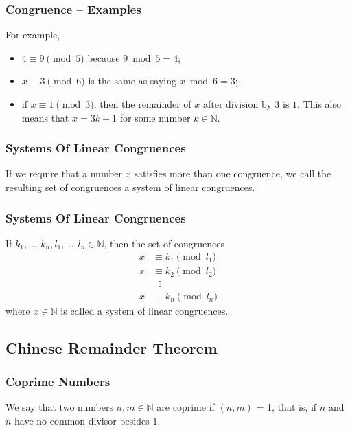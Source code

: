 \documentclass[aspectratio=169,11pt,usenames,dvipsnames]{beamer}
\newcommand{\N}{\mathbb{N}}
\begin{document}
\begin{frame}
 \frametitle{Congruence -- Examples}
 For example,
 \begin{itemize}
  \item $4 \equiv 9 \pmod{5}$ because $9 \bmod 5 = 4$;
  \pause
  \item $x \equiv 3 \pmod{6}$ is the same as saying $x \bmod 6 = 3$;
  \pause
  \item if $x \equiv 1 \pmod{3}$, then the remainder of $x$ after division by
   $3$ is $1$. This also means that $x = 3k + 1$ for some number $k \in \N$.
 \end{itemize}
\end{frame}

\begin{frame}
 \frametitle{Systems Of Linear Congruences}
 If we require that a number $x$ satisfies more than one congruence, we call the
 resulting set of congruences a \alert{system of linear congruences}.\\
\end{frame}

\begin{frame}
 \frametitle{Systems Of Linear Congruences}
 \begin{tcolorbox}[title=System Of Linear Congruences]
  If $k_1,\ldots,k_n,l_1,\ldots,l_n \in \N$, then the set of congruences
  \begin{equation*}
   \begin{split}
    x & \equiv k_1 \pmod{l_1}\\
    x & \equiv k_2 \pmod{l_2}\\
      &~~~\vdots\\
    x & \equiv k_n \pmod{l_n}
   \end{split}
  \end{equation*}
  where $x \in \N$ is called a \alert{system of linear congruences}.
 \end{tcolorbox}
\end{frame}

\subsection{Chinese Remainder Theorem}

\begin{frame}
 \subsectionpage
\end{frame}

\begin{frame}
 \frametitle{Coprime Numbers}
 \begin{tcolorbox}[title=Coprime Numbers]
  We say that two numbers $n,m \in \N$ are \alert{coprime} if $(n,m)$ = 1, that
  is, if $n$ and $n$ have no common divisor besides $1$.
 \end{tcolorbox}
\end{frame}
\end{document}
